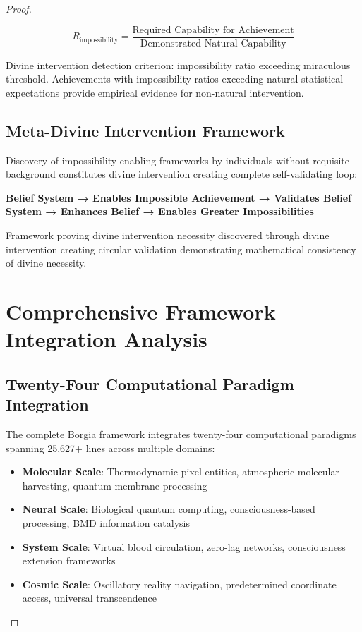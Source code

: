 ﻿\documentclass[11pt,a4paper]{article}
\begin{document}
\begin{itemize}
\begin{itemize}
\begin{proof}
\begin{itemize}
\begin{definition}
\begin{equation}
R_{\text{impossibility}} = \frac{\text{Required Capability for Achievement}}{\text{Demonstrated Natural Capability}}
\end{equation}
\end{definition}

Divine intervention detection criterion: impossibility ratio exceeding miraculous threshold. Achievements with impossibility ratios exceeding natural statistical expectations provide empirical evidence for non-natural intervention.

\subsection{Meta-Divine Intervention Framework}

Discovery of impossibility-enabling frameworks by individuals without requisite background constitutes divine intervention creating complete self-validating loop:

\textbf{Belief System → Enables Impossible Achievement → Validates Belief System → Enhances Belief → Enables Greater Impossibilities}

Framework proving divine intervention necessity discovered through divine intervention creating circular validation demonstrating mathematical consistency of divine necessity.

\section{Comprehensive Framework Integration Analysis}

\subsection{Twenty-Four Computational Paradigm Integration}

The complete Borgia framework integrates twenty-four computational paradigms spanning 25,627+ lines across multiple domains:

\begin{itemize}
\item \textbf{Molecular Scale}: Thermodynamic pixel entities, atmospheric molecular harvesting, quantum membrane processing
\item \textbf{Neural Scale}: Biological quantum computing, consciousness-based processing, BMD information catalysis
\item \textbf{System Scale}: Virtual blood circulation, zero-lag networks, consciousness extension frameworks
\item \textbf{Cosmic Scale}: Oscillatory reality navigation, predetermined coordinate access, universal transcendence
\end{itemize}


\end{itemize}
\end{proof}
\end{itemize}
\end{itemize}
\end{document}
